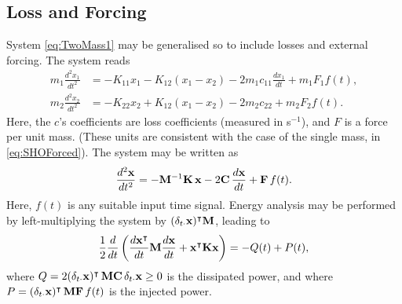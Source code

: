 \subsection{Loss and Forcing}

System \eqref{eq:TwoMass1} may be generalised so to include losses and external forcing. The system reads
\begin{subequations}\label{eq:TwoMass2}
\begin{align}
m_1 \frac{d^2 x_1}{dt^2} &= -K_{11}x_1 - K_{12}(x_1 - x_2) -2m_1c_{11}\frac{dx_{1}}{dt} + m_1 F_1 f(t), \label{eq:TwoMass2a} \\
m_2 \frac{d^2 x_2}{dt^2} &= -K_{22}x_2 + K_{12}(x_1 - x_2) - 2m_2 c_{22} + m_2 F_2 f(t) . \label{eq:TwoMass2b}
\end{align}
\end{subequations}
Here, the $c$'s coefficients are loss coefficients (measured in s$^{-1}$), and $F$ is a force per unit mass. (These units are consistent with the case of the single mass, in \eqref{eq:SHOForced}). The system may be written as
\begin{equation}\label{eq:tempTwoModes1}
\frac{d^2{\bf x}}{dt^2} = -{\bf M}^{-1}{\bf K} \, {\bf x} - 2 {\bf C} \, \frac{d{\bf x}}{dt} + {\bf F}\, f(t).
\end{equation}
Here, $f(t)$ is any suitable input time signal. Energy analysis may be performed by left-multiplying the system by $(\delta_{t\cdot} {\bf x})^\intercal {\bf M}$, leading to
\begin{equation}
\frac{1}{2}\frac{d}{dt}\left(\frac{d{\bf x}^\intercal}{dt} {\bf M} \frac{d{\bf x}}{dt} + {\bf x}^\intercal {\bf K} {\bf x}\right) = -Q(t) + P(t),
\end{equation}
where $Q = 2(\delta_{t\cdot} {\bf x})^\intercal \,{\bf M}{\bf C} \, \delta_{t\cdot} {\bf x} \geq 0$ is the dissipated power, and where $P = (\delta_{t\cdot} {\bf x})^\intercal \, {\bf M}{\bf F} \, f(t)$ is the injected power.









